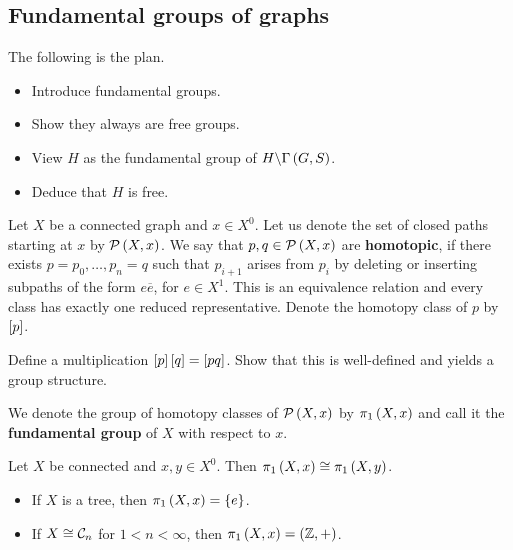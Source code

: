 \subsection{Fundamental groups of graphs}

The following is the plan.
\begin{itemize}
\item Introduce fundamental groups.
\item Show they always are free groups.
\item View $ H $ as the fundamental group of $ H \backslash \Gamma\br{G, S} $.
\item Deduce that $ H $ is free.
\end{itemize}

Let $ X $ be a connected graph and $ x \in X^0 $. Let us denote the set of closed paths starting at $ x $ by $ \PPP\br{X, x} $. We say that $ p, q \in \PPP\br{X, x} $ are \textbf{homotopic}, if there exists $ p = p_0, \dots, p_n = q $ such that $ p_{i + 1} $ arises from $ p_i $ by deleting or inserting subpaths of the form $ e\overline{e} $, for $ e \in X^1 $. This is an equivalence relation and every class has exactly one reduced representative. Denote the homotopy class of $ p $ by $ \sbr{p} $.

\begin{exercise}
Define a multiplication $ \sbr{p}\sbr{q} = \sbr{pq} $. Show that this is well-defined and yields a group structure.
\end{exercise}

\pagebreak

\begin{definition}
We denote the group of homotopy classes of $ \PPP\br{X, x} $ by $ \pi_1\br{X, x} $ and call it the \textbf{fundamental group} of $ X $ with respect to $ x $.
\end{definition}

\begin{exercise}
Let $ X $ be connected and $ x, y \in X^0 $. Then $ \pi_1\br{X, x} \cong \pi_1\br{X, y} $.
\end{exercise}


\begin{example}
\hfill
\begin{itemize}
\item If $ X $ is a tree, then $ \pi_1\br{X, x} = \cbr{e} $.
\item If $ X \cong \mathcal{C}_n $ for $ 1 < n < \infty $, then $ \pi_1\br{X, x} = \br{\ZZ, +} $.
\end{itemize}
\end{example}

